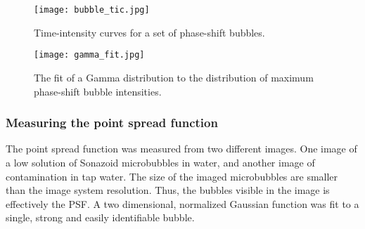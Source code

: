\begin{figure}[h]
  \centering
  \texttt{[image: bubble\_tic.jpg]}
  \caption{Time-intensity curves for a set of phase-shift bubbles.}
  \label{Fig:bubble_tic}
\end{figure}
\begin{figure}[h]
  \centering
  \texttt{[image: gamma\_fit.jpg]}
  \caption{The fit of a Gamma distribution to the distribution of maximum phase-shift bubble intensities.}
  \label{Fig:gamma_fit}
\end{figure}

\subsubsection{Measuring the point spread function}
The point spread function was measured from two different images. One image of a low solution of Sonazoid\texttrademark{} microbubbles in water, and another image of contamination in tap water. The size of the imaged microbubbles are smaller than the image system resolution. Thus, the bubbles visible in the image is effectively the PSF. A two dimensional, normalized Gaussian function was fit to a single, strong and easily identifiable bubble. 

% 
%
%


\clearpage

